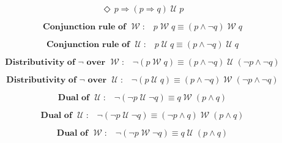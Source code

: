 \documentclass[12pt, fleqn, leqno]{article}
\newcommand{\impl}{\ensuremath{\Rightarrow}}        %
\newcommand{\Until}{\;\mathcal{U}\;}
\newcommand{\Wait}{\;\mathcal{W}\;}
\newcommand{\Event}{\Diamond\,}
\newcommand{\spacer}{\vspace{-30pt}}
\begin{document}
\spacer

\begin{equation}\label{E:eventPImplPImplUntilp}
\Event p\impl(p\impl q)\Until p
\end{equation}

\spacer

\begin{equation}\label{E:conRuleWait}
\textbf{Conjunction rule of $\Wait$:}\quad p\Wait q\equiv (p\land \neg q)\Wait q
\end{equation}

\spacer

\begin{equation}\label{E:conRuleUntil}
\textbf{Conjunction rule of $\Until$:}\quad p\Until q\equiv (p\land \neg q)\Until q
\end{equation}

\spacer

\begin{equation}\label{E:notWait2}
\textbf{Distributivity of $\neg$ over $\Wait$:}\quad \neg(p\Wait q)\equiv (p\land \neg q)\Until(\neg p\land \neg q)
\end{equation}

\spacer

\begin{equation}\label{E:notUntil2}
\textbf{Distributivity of $\neg$ over $\Until$:}\quad \neg(p\Until q)\equiv (p\land \neg q)\Wait(\neg p\land \neg q)
\end{equation}

\spacer
\begin{equation}\label{E:DualUntil1}
\textbf{Dual of $\Until$:}\quad \neg (\neg p \Until \neg q) \equiv q \Wait (p \land q)
\end{equation}

\spacer

\begin{equation}\label{E:DualUntil2}
\textbf{Dual of $\Until$:}\quad \neg (\neg p \Until \neg q) \equiv ( \neg p \land q) \Wait (p \land q)
\end{equation}

\spacer

\begin{equation}\label{E:DualWait1}
\textbf{Dual of $\Wait$:}\quad \neg (\neg p \Wait \neg q) \equiv q \Until (p \land q)
\end{equation}
\end{document}

